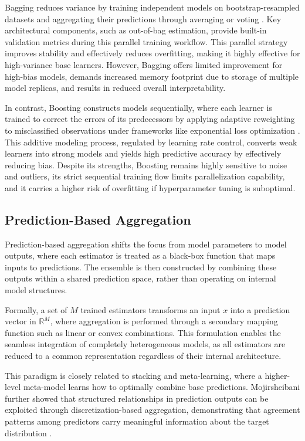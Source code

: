 Bagging reduces variance by training independent models on bootstrap-resampled datasets and aggregating their predictions through averaging or voting \cite{breiman1996}. Key architectural components, such as out-of-bag estimation, provide built-in validation metrics during this parallel training workflow. This parallel strategy improves stability and effectively reduces overfitting, making it highly effective for high-variance base learners. However, Bagging offers limited improvement for high-bias models, demands increased memory footprint due to storage of multiple model replicas, and results in reduced overall interpretability.

In contrast, Boosting constructs models sequentially, where each learner is trained to correct the errors of its predecessors by applying adaptive reweighting to misclassified observations under frameworks like exponential loss optimization \cite{freund1997}. This additive modeling process, regulated by learning rate control, converts weak learners into strong models and yields high predictive accuracy by effectively reducing bias. Despite its strengths, Boosting remains highly sensitive to noise and outliers, its strict sequential training flow limits parallelization capability, and it carries a higher risk of overfitting if hyperparameter tuning is suboptimal.

\subsection{Prediction-Based Aggregation}

\hs Prediction-based aggregation shifts the focus from model parameters to model outputs, where each estimator is treated as a black-box function that maps inputs to predictions. The ensemble is then constructed by combining these outputs within a shared prediction space, rather than operating on internal model structures.

Formally, a set of $M$ trained estimators transforms an input $x$ into a prediction vector in $\mathbb{R}^M$, where aggregation is performed through a secondary mapping function such as linear or convex combinations. This formulation enables the seamless integration of completely heterogeneous models, as all estimators are reduced to a common representation regardless of their internal architecture.

This paradigm is closely related to stacking and meta-learning, where a higher-level meta-model learns how to optimally combine base predictions. Mojirsheibani further showed that structured relationships in prediction outputs can be exploited through discretization-based aggregation, demonstrating that agreement patterns among predictors carry meaningful information about the target distribution \cite{mojirsheibani1999}.


